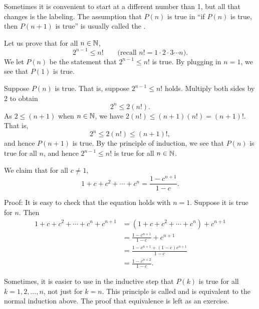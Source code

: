 Sometimes it is convenient to start at a different number than 1, but 
all that changes is the labeling.  The assumption that
$P(n)$ is true in ``if $P(n)$ is true,
then $P(n+1)$ is true''
is usually called the \emph{}.

\begin{example}
Let us prove that for all $n \in {\mathbb{N}}$,
\begin{equation*}
2^{n-1} \leq n! \qquad \text{(recall $n! = 1 \cdot 2 \cdot 3 \cdots n$)}.
\end{equation*}
We let $P(n)$ be the statement that
$2^{n-1} \leq n!$ is true.  By plugging in $n=1$, we see that $P(1)$
is true.

Suppose $P(n)$ is true.  That is, suppose 
$2^{n-1} \leq n!$ holds.  Multiply both sides by 2 to obtain
\begin{equation*}
2^n \leq 2(n!) .
\end{equation*}
As $2 \leq (n+1)$ when $n \in {\mathbb{N}}$, we have
$2(n!) \leq (n+1)(n!) = (n+1)!$.  That is,
\begin{equation*}
2^n \leq 2(n!) \leq  (n+1)!,
\end{equation*}
and hence $P(n+1)$ is true.  By the principle of induction, we see that
$P(n)$
is true for all $n$, and hence
$2^{n-1} \leq n!$ is true for all $n \in {\mathbb{N}}$.
\end{example}

\begin{example} \label{example:geometricsum}
We claim that for all $c \not= 1$,
\begin{equation*}
1 + c + c^2 + \cdots + c^n = \frac{1-c^{n+1}}{1-c} .
\end{equation*}

Proof: It is easy to check that the equation holds with $n=1$.  Suppose 
it is true for $n$.  Then
\begin{equation*}
\begin{split}
1 + c + c^2 + \cdots + c^n + c^{n+1} & =
( 1 + c + c^2 + \cdots + c^n ) + c^{n+1} \\
& = \frac{1-c^{n+1}}{1-c}  + c^{n+1} \\
& = \frac{1-c^{n+1}  + (1-c)c^{n+1}}{1-c} \\
& = \frac{1-c^{n+2}}{1-c} .
\end{split}
\end{equation*}
\end{example}

Sometimes, it is easier to use in the inductive step
that $P(k)$ is true for all $k = 1,2,\ldots,n$, not just for $k=n$.
This principle is called \emph{} and is equivalent
to the normal induction above.  The proof that
equivalence is left as an exercise.

